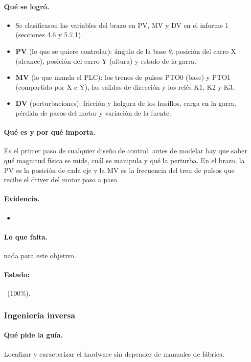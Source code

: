 \documentclass[a4paper,11pt]{article}
\begin{document}
\paragraph{Qué se logró.}
\begin{itemize}
\item Se clasificaron las variables del brazo en PV, MV y DV en el informe 1 (secciones 4.6 y 5.7.1).
\item \textbf{PV} (lo que se quiere controlar): ángulo de la base $\theta$, posición del carro X (alcance), posición del carro Y (altura) y estado de la garra.
\item \textbf{MV} (lo que manda el PLC): los trenes de pulsos PTO0 (base) y PTO1 (compartido por X e Y), las salidas de dirección y los relés K1, K2 y K3.
\item \textbf{DV} (perturbaciones): fricción y holgura de los husillos, carga en la garra, pérdida de pasos del motor y variación de la fuente.
\end{itemize}
\paragraph{Qué es y por qué importa.} Es el primer paso de cualquier diseño de control: antes de modelar hay que saber qué magnitud física se mide, cuál se manipula y qué la perturba. En el brazo, la PV es la posición de cada eje y la MV es la frecuencia del tren de pulsos que recibe el driver del motor paso a paso.
\paragraph{Evidencia.}
\begin{itemize}\small
\item {}
\end{itemize}
\paragraph{Lo que falta.} nada para este objetivo.
\paragraph{Estado:} \cumple~(100\%).
\subsubsection{Ingeniería inversa}
\paragraph{Qué pide la guía.} Localizar y caracterizar el hardware sin depender de manuales de fábrica.
\end{document}
